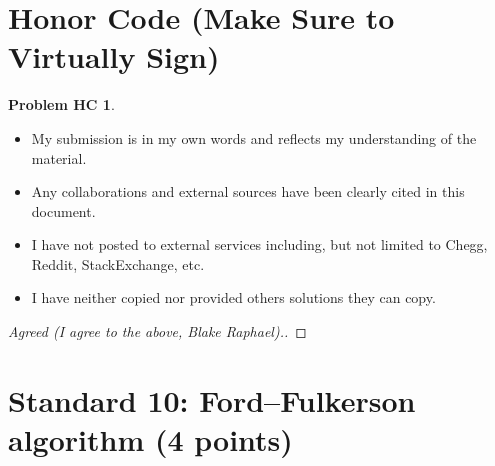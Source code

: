 \documentclass[11pt]{article}
\theoremstyle{definition}
\theoremstyle{definition}
\newtheorem*{requiredHC}{Problem HC}
\theoremstyle{definition}
\begin{document}
\newpage
\section*{Honor Code (Make Sure to Virtually Sign)} \label{HonorCode}
\hypertarget{HonorCode}{}

\begin{requiredHC}
\begin{itemize}
\item My submission is in my own words and reflects my understanding of the material.
\item Any collaborations and external sources have been clearly cited in this document.
\item I have not posted to external services including, but not limited to Chegg, Reddit, StackExchange, etc.
\item I have neither copied nor provided others solutions they can copy.
\end{itemize}

\end{requiredHC}

\begin{proof}[Agreed (I agree to the above, Blake Raphael).]
\end{proof}


\newpage
\setcounter{section}{9}
\section{Standard 10: Ford--Fulkerson algorithm (4 points)}
\end{document}
